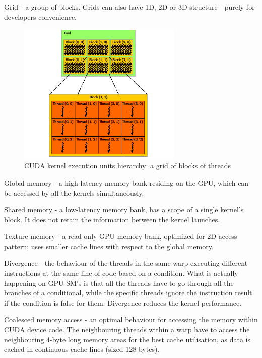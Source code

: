 \documentclass[12pt,a4paper]{report}
\newcommand{\draft}[1]{#1}
\begin{document}
Grid - a group of blocks. Grids can also have 1D, 2D or 3D structure - purely for developers convenience.
\begin{figure}
    \centering
    \includegraphics[width=0.7\textwidth]{pics/grid-of-thread-blocks.png}
    \caption{CUDA kernel execution units hierarchy: a grid of blocks of threads}
    \label{fig:grid}
\end{figure}
\FloatBarrier

Global memory - a high-latency memory bank residing on the GPU, which can be accessed by all the kernels simultaneously.

Shared memory - a low-latency memory bank, has a scope of a single kernel's block. It does not retain the information between the kernel launches.

Texture memory - a read only GPU memory bank, optimized for 2D access pattern; uses smaller cache lines with respect to the global memory.

Divergence - the behaviour of the threads in the same warp executing different instructions at the same line of code based on a condition. What is actually happening on GPU SM's is that all the threads have to go through all the branches of a conditional, while the specific threads ignore the instruction result if the condition is false for them. Divergence reduces the kernel performance.

Coalesced memory access - an optimal behaviour for accessing the memory within CUDA device code. The neighbouring threads within a warp have to access the neighbouring 4-byte long memory areas for the best cache utilisation, as data is cached in continuous cache lines (sized 128 bytes). 

\end{document}
